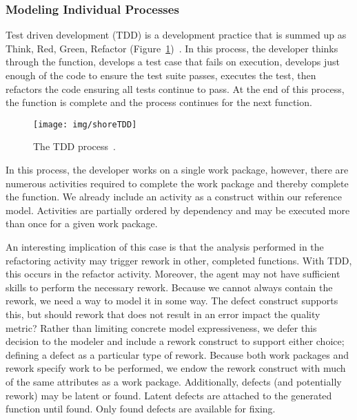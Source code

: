 \subsubsection{Modeling Individual Processes}
Test driven development (TDD) is a development practice that is summed up as
Think, Red, Green, Refactor (Figure~\ref{fig:tdd})~\cite{shore_art_2010}.
In this process, the developer thinks through the function, develops a test case
that fails on execution, develops just enough of the code to ensure the test
suite passes, executes the test, then refactors the code ensuring all
tests continue to pass.  At the end of this process, the function
is complete and the process continues for the next function.

\begin{figure}[htb]
    \centering
        \texttt{[image: img/shoreTDD]}
    \caption{The TDD process~\cite{shore_art_2010}.}
    \label{fig:tdd}
\end{figure}

In this process, the developer works on a single work package,
however, there are numerous activities required to complete the work package and
thereby complete the function.  We already include an activity as a construct
within our reference model.  Activities are partially ordered by dependency and 
may be executed more than once for a given work package.

An interesting implication of this case is that the analysis performed in the
refactoring activity may trigger rework in other, completed functions.  With
TDD, this occurs in the refactor activity.  Moreover, the agent may not have
sufficient skills to perform the necessary rework.
Because we cannot always contain the rework, we need a way to model it in some
way.  The defect construct supports this, but should rework that does not result
in an error impact the quality metric?
Rather than limiting concrete model expressiveness, we defer this decision to
the modeler and include a rework construct to support either choice; defining a
defect as a particular type of rework.  Because both work packages and rework
specify work to be performed, we endow the rework construct with much of the
same attributes as a work package.
Additionally, defects (and potentially rework) may be latent or found.  Latent
defects are attached to the generated function until found.  Only found defects
are available for fixing.

